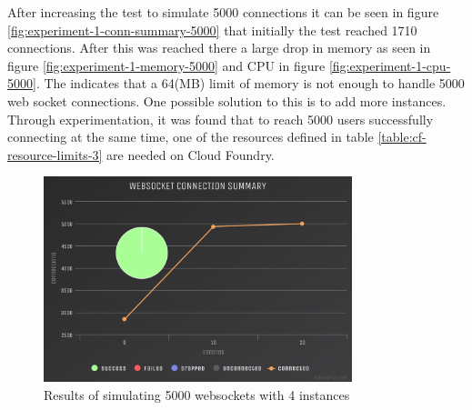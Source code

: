 After increasing the test to simulate 5000 connections it can be seen in figure \ref{fig:experiment-1-conn-summary-5000} that initially the test reached 1710 connections. After this was reached there a large drop in memory as seen in figure \ref{fig:experiment-1-memory-5000} and CPU in figure \ref{fig:experiment-1-cpu-5000}. The indicates that a 64(MB) limit of memory is not enough to handle 5000 web socket connections. One possible solution to this is to add more instances. Through experimentation, it was found that to reach 5000 users successfully connecting at the same time, one of the resources defined in table \ref{table:cf-resource-limits-3} are needed on Cloud Foundry.

\begin{table}[H]
\caption{Cloud Foundry Resource Limits}
\label{table:cf-resource-limits-3}
\end{table}

\begin{figure}[H]
  \centering
    \includegraphics[width=0.8\textwidth]{figures/experiments/experiment-1/node-js/conn-summary-5000-4-instances.png}
    \caption{Results of simulating 5000 websockets with 4 instances}
    \label{fig:experiment-1-conn-summary-5000-4-instances}
\end{figure}

